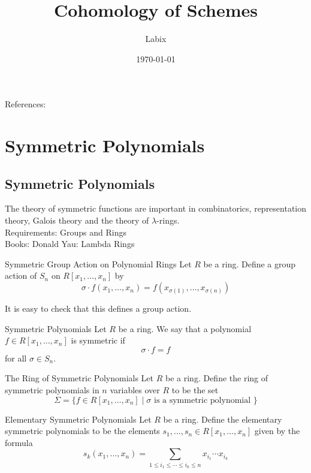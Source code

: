 \documentclass[a4paper]{article}
\title{Cohomology of Schemes}
\author{Labix}
\date{\today}
\begin{document}
\maketitle
\begin{abstract}
\end{abstract}

References: 
\pagebreak
\tableofcontents

\pagebreak
\section{Symmetric Polynomials}
\subsection{Symmetric Polynomials}
The theory of symmetric functions are important in combinatorics, representation theory, Galois theory and the theory of $\lambda$-rings. \\

Requirements: Groups and Rings\\
Books: Donald Yau: Lambda Rings

\begin{defn}{Symmetric Group Action on Polynomial Rings}{} Let $R$ be a ring. Define a group action of $S_n$ on $R[x_1,\dots,x_n]$ by $$\sigma\cdot f(x_1,\dots,x_n)=f(x_{\sigma(1)},\dots,x_{\sigma(n)})$$
\end{defn}

It is easy to check that this defines a group action. 

\begin{defn}{Symmetric Polynomials}{} Let $R$ be a ring. We say that a polynomial $f\in R[x_1,\dots,x_n]$ is symmetric if $$\sigma\cdot f=f$$ for all $\sigma\in S_n$. 
\end{defn}

\begin{defn}{The Ring of Symmetric Polynomials}{} Let $R$ be a ring. Define the ring of symmetric polynomials in $n$ variables over $R$ to be the set $$\Sigma=\{f\in R[x_1,\dots,x_n]\;|\;\sigma\text{ is a symmetric polynomial }\}$$
\end{defn}

\begin{defn}{Elementary Symmetric Polynomials}{} Let $R$ be a ring. Define the elementary symmetric polynomials to be the elements $s_1,\dots,s_n\in R[x_1,\dots,x_n]$ given by the formula $$s_k(x_1,\dots,x_n)=\sum_{1\leq i_1\leq\cdots\leq i_k\leq n}x_{i_1}\cdots x_{i_k}$$
\end{defn}
\end{document}

